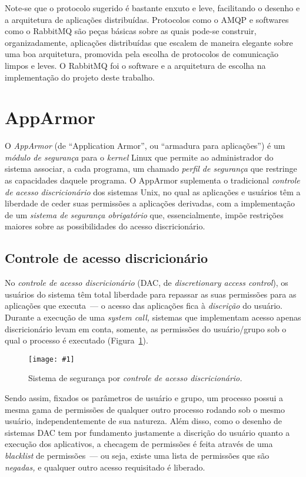 \documentclass[ruledheader, 12pt]{abnt}
\newcommand{\figcustom}[4]{\par
	\begin{figure}[#3]
		\centering
		\texttt{[image: \#1]}
		\caption{\label{fig:#1}#2}
	\end{figure}
\par}
\newcommand{\figref}[1]{(Figura~\ref{fig:#1})}
\begin{document}
\afterpage{\clearpage}

Note-se que o protocolo sugerido é bastante enxuto e leve, facilitando o desenho e a arquitetura de aplicações distribuídas. Protocolos como o AMQP e softwares como o RabbitMQ são peças básicas sobre as quais pode-se construir, organizadamente, aplicações distribuídas que escalem de maneira elegante sobre uma boa arquitetura, promovida pela escolha de protocolos de comunicação limpos e leves. O RabbitMQ foi o software e a arquitetura de escolha na implementação do projeto deste trabalho.

\section{AppArmor}

O \emph{AppArmor} (de ``Application Armor'', ou ``armadura para aplicações'') é um \emph{módulo de segurança} para o \emph{kernel} Linux que permite ao administrador do sistema associar, a cada programa, um chamado \emph{perfil de segurança} que restringe as capacidades daquele programa. O AppArmor suplementa o tradicional \emph{controle de acesso discricionário} dos sistemas Unix, no qual as aplicações e usuários têm a liberdade de ceder suas permissões a aplicações derivadas, com a implementação de um \emph{sistema de segurança obrigatório} que, essencialmente, impõe restrições maiores sobre as possibilidades do acesso discricionário.


\subsection{Controle de acesso discricionário}

No \emph{controle de acesso discricionário} (DAC, de \emph{discretionary access control}), os usuários do sistema têm total liberdade para repassar as suas permissões para as aplicações que executa~--- o acesso das aplicações fica à \emph{discrição} do usuário. Durante a execução de uma \emph{system call,} sistemas que implementam acesso apenas discricionário levam em conta, somente, as permissões do usuário/grupo sob o qual o processo é executado \figref{syscalls-dac}. 

\figcustom{syscalls-dac}{Sistema de segurança por \emph{controle de acesso discricionário.}}{bp}{.8}

Sendo assim, fixados os parâmetros de usuário e grupo, um processo possui a mesma gama de permissões de qualquer outro processo rodando sob o mesmo usuário, independentemente de sua natureza. Além disso, como o desenho de sistemas DAC tem por fundamento justamente a discrição do usuário quanto a execução dos aplicativos, a checagem de permissões é feita através de uma \emph{blacklist} de permissões~--- ou seja, existe uma lista de permissões que são \emph{negadas,} e qualquer outro acesso requisitado é liberado.
\end{document}
